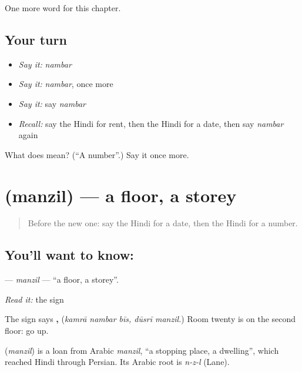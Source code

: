 \begin{grammarlens}[title={What you've built}]
One more word for this chapter.
\end{grammarlens}

\subsection*{Your turn}
\begin{itemize}
\raggedright
  \item \emph{Say it:} \emph{nambar}
  \item \emph{Say it:} \emph{nambar}, once more
  \item \emph{Say it:} say \emph{nambar}
  \item \emph{Recall:} say the Hindi for rent, then the Hindi for a date, then say \emph{nambar} again
\end{itemize}

\begin{tcolorbox}[breakable,colback=teal!4,colframe=teal!35!black,title={Before you move on}]
What does  mean? (\textquotedblleft{}A number\textquotedblright{}.) Say it once more.
\end{tcolorbox}
\section[\texorpdfstring{\hi{मंज़िल} (manzil)}{मंज़िल (manzil)}]{ (manzil) — a floor, a storey}

\label{lesson:HI-C167-manzil}



\begin{quote}
Before the new one: say the Hindi for a date, then the Hindi for a number.
\end{quote}

\subsection*{You'll want to know: }
\textbf{} — \emph{manzil} — \textquotedblleft{}a floor, a storey\textquotedblright{}.

\emph{Read it:} the sign

The sign says \textbf{  ,  } (\emph{kamrā nambar bīs, dūsrī manzil.}) Room twenty is on the second floor: go up.

\begin{cousinweb}
\textbf{} (\emph{manzil}) is a loan from Arabic \emph{manzil}, \textquotedblleft{}a stopping place, a dwelling\textquotedblright{}, which reached Hindi through Persian. Its Arabic root is \emph{n-z-l} (Lane).
\end{cousinweb}

